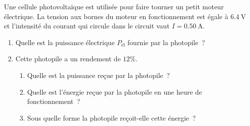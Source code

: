 Une cellule photovoltaïque est utilisée pour faire tourner un petit moteur
électrique. La tension aux bornes du moteur en fonctionnement est égale à
$\qty{6,4}{\volt}$ et l'intensité du courant qui circule dans le circuit vaut
$I=\qty{0,50}{\ampere}$.
\begin{enumerate}
    \item Quelle est la puissance électrique $P_{\text{él}}$ fournie par la
          photopile~?
    \item Cette photopile a un rendement de $12\%$.
          \begin{enumerate}
              \item Quelle est la puissance reçue par la photopile~?
              \item Quelle est l'énergie reçue par la photopile en une heure de
                    fonctionnement~?
              \item Sous quelle forme la photopile reçoit-elle cette énergie~?
          \end{enumerate}
\end{enumerate}

